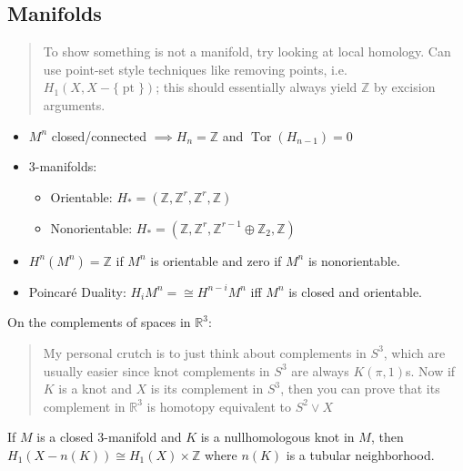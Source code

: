 
\hypertarget{manifolds}{%
\subsection{Manifolds}\label{manifolds}}

\begin{quote}
To show something is not a manifold, try looking at local homology. Can
use point-set style techniques like removing points,
i.e.~\(H_1(X, X-{\{\operatorname{pt}\}})\); this should essentially
always yield \({\mathbb{Z}}\) by excision arguments.
\end{quote}

\begin{itemize}
\tightlist
\item
  \(M^n\) closed/connected \(\implies H_n = {\mathbb{Z}}\) and
  \(\operatorname{Tor}(H_{n-1}) = 0\)
\item
  3-manifolds:

  \begin{itemize}
  \tightlist
  \item
    Orientable:
    \(H_* = ({\mathbb{Z}}, {\mathbb{Z}}^r, {\mathbb{Z}}^r, {\mathbb{Z}})\)
  \item
    Nonorientable:
    \(H_* = ({\mathbb{Z}}, {\mathbb{Z}}^r, {\mathbb{Z}}^{r-1} \oplus {\mathbb{Z}}_2, {\mathbb{Z}})\)
  \end{itemize}
\item
  \(H^n(M^n) = {\mathbb{Z}}\) if \(M^n\) is orientable and zero if
  \(M^n\) is nonorientable.
\item
  Poincaré Duality: \(H_i M^n =\cong H^{n-i} M^n\) iff \(M^n\) is closed
  and orientable.
\end{itemize}

On the complements of spaces in \({\mathbb{R}}^3\):

\begin{quote}
My personal crutch is to just think about complements in \(S^3\), which
are usually easier since knot complements in \(S^3\) are always
\(K(\pi, 1)\)s. Now if \(K\) is a knot and \(X\) is its complement in
\(S^3\), then you can prove that its complement in \({\mathbb{R}}^3\) is
homotopy equivalent to \(S^2\vee X\)
\end{quote}

If \(M\) is a closed 3-manifold and \(K\) is a nullhomologous knot in
\(M\), then \(H_1(X -n(K)) \cong H_1(X) \times {\mathbb{Z}}\) where
\(n(K)\) is a tubular neighborhood.


